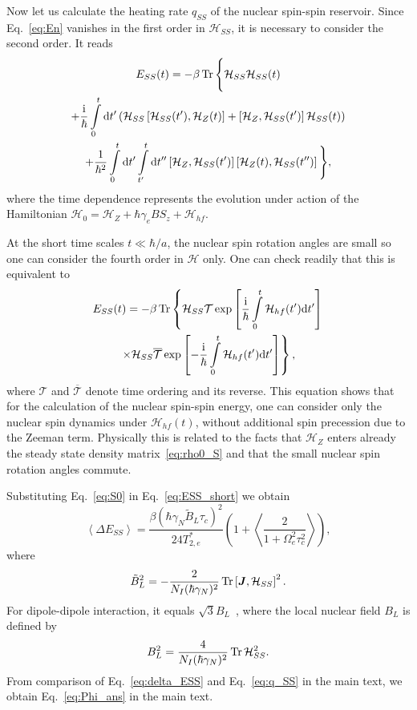 \documentclass[prl,nobibnotes,twocolumn,aps,longbibliography,superscriptaddress,notoc]{revtex4-1}
\newcommand{\Tr}{\mathop{\rm Tr}}
\renewcommand{\i}{{\rm i}}
\renewcommand{\d}{\mathrm d}
\newcommand{\braket}[1]{\left\langle #1 \right\rangle}
\begin{document}
Now let us calculate the heating rate $q_{SS}$ of the nuclear spin-spin reservoir. Since Eq.~\eqref{eq:En} vanishes in the first order in $\mathcal H_{SS}$, it is necessary to consider the second order. It reads
\begin{multline}
  \label{eq:ESS_general}
  E_{SS}(t)=-\beta\Tr\Bigg\{\mathcal H_{SS}\mathcal H_{SS}(t)\\
  +\frac{\i}{\hbar}\int\limits_0^t\d t'\left(\mathcal H_{SS}\left[\mathcal H_{SS}(t'),\mathcal H_Z(t)\right]+\left[\mathcal H_Z,\mathcal H_{SS}(t')\right]\mathcal H_{SS}(t)\right)\\
  +\frac{1}{\hbar^2}\int\limits_0^t\d t'\int\limits_{t'}^t\d t''\left[\mathcal H_Z,\mathcal H_{SS}(t')\right]\left[\mathcal H_Z(t),\mathcal H_{SS}(t'')\right]\Bigg\},
\end{multline}
where the time dependence represents the evolution under action of the Hamiltonian $\mathcal H_0=\mathcal H_Z+\hbar\gamma_eBS_z+\mathcal H_{hf}$.

At the short time scales $t\ll\hbar/a$, the nuclear spin rotation angles are small so one can consider the fourth order in $\mathcal H$ only. One can check readily that this is equivalent to
\begin{multline}
  \label{eq:ESS_short}
  E_{SS}(t)=-\beta\Tr\left\{\mathcal H_{SS}\mathcal T\exp\left[\frac{\i}{\hbar}\int\limits_0^t\mathcal H_{hf}(t')\d t'\right]
  \right.\\\left.
    \times\mathcal H_{SS}\overline{\mathcal T}\exp\left[-\frac{\i}{\hbar}\int\limits_0^t\mathcal H_{hf}(t')\d t'\right]\right\},
\end{multline}
where $\mathcal T$ and $\overline{\mathcal T}$ denote time ordering and its reverse. This equation shows that for the calculation of the nuclear spin-spin energy, one can consider only the nuclear spin dynamics under $\mathcal H_{hf}(t)$, without additional spin precession due to the Zeeman term. Physically this is related to the facts that $\mathcal H_Z$ enters already the steady state density matrix~\eqref{eq:rho0_S} and that the small nuclear spin rotation angles commute.

Substituting Eq.~\eqref{eq:S0} in Eq.~\eqref{eq:ESS_short} we obtain
\begin{equation}
  \label{eq:delta_ESS}
  \braket{\Delta E_{SS}}=\frac{\beta(\hbar\gamma_N\tilde B_L\tau_c)^2}{24T_{2,e}^*}\left(1+\braket{\frac{2}{1+\Omega_e^2\tau_c^2}}\right),
\end{equation}
where
\begin{equation}
  {\tilde B}_L^2=-\frac{2}{N_I(\hbar\gamma_N)^2}\Tr\left[\bm J,\mathcal H_{SS}\right]^2.
\end{equation}
For dipole-dipole interaction, it equals $\sqrt{3}B_L$~\cite{S_abragam,S_OptOrCh2}, where the local nuclear field $B_L$ is defined by
\begin{equation}
  B_L^2=\frac{4}{N_I(\hbar\gamma_N)^2}\Tr\mathcal H_{SS}^2.
\end{equation}
From comparison of Eq.~\eqref{eq:delta_ESS} and Eq.~\eqref{eq:q_SS} in the main text, we obtain Eq.~\eqref{eq:Phi_ans} in the main text.
\end{document}
